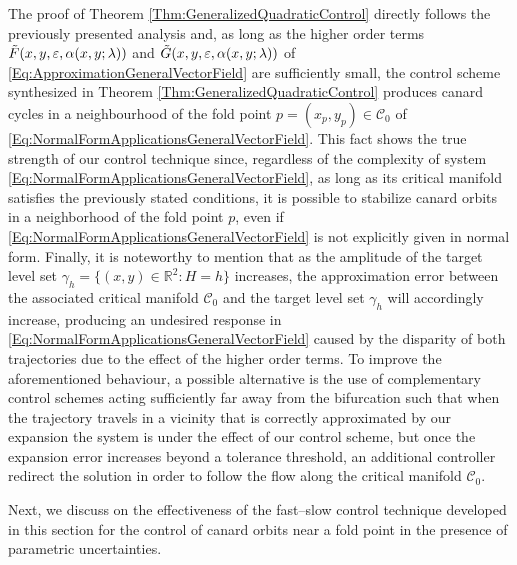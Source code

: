 \documentclass[3p]{elsarticle}
\theoremstyle{plain}
\theoremstyle{remark}
\theoremstyle{definition}
\begin{document}
    The proof of Theorem \ref{Thm:GeneralizedQuadraticControl} directly follows the previously presented analysis and, as long as the higher order terms $\Tilde{F}(x,y,\varepsilon,\alpha(x,y;\lambda))$ and $\Tilde{G}(x,y,\varepsilon,\alpha(x,y;\lambda))$ of \eqref{Eq:ApproximationGeneralVectorField} are sufficiently small, the control scheme synthesized in Theorem \ref{Thm:GeneralizedQuadraticControl} produces canard cycles in a neighbourhood of the fold point $p=(x_{p}, y_{p})\in\mathcal{C}_{0}$ of \eqref{Eq:NormalFormApplicationsGeneralVectorField}. This fact shows the true strength of our control technique since, regardless of the complexity of system \eqref{Eq:NormalFormApplicationsGeneralVectorField}, as long as its critical manifold satisfies the previously stated conditions, it is possible to stabilize canard orbits in a neighborhood of the fold point $p$, even if \eqref{Eq:NormalFormApplicationsGeneralVectorField} is not explicitly given in normal form. Finally, it is noteworthy to mention that as the amplitude of the target level set $\gamma_{h} = \{ (x,y)\in\mathbb{R}^{2}:H=h \}$ increases, the approximation error between the associated critical manifold $\mathcal{C}_{0}$ and the target level set $\gamma_{h}$ will accordingly increase, producing an undesired response in \eqref{Eq:NormalFormApplicationsGeneralVectorField} caused by the disparity of both trajectories due to the effect of the higher order terms. To improve the aforementioned behaviour, a possible alternative is the use of complementary control schemes acting sufficiently far away from the bifurcation such that when the trajectory travels in a vicinity that is correctly approximated by our expansion the system is under the effect of our control scheme, but once the expansion error increases beyond a tolerance threshold, an additional controller redirect the solution in order to follow the flow along the critical manifold $\mathcal{C}_{0}$.

Next, we discuss on the effectiveness of the fast--slow control technique developed in this section for the control of canard orbits near a fold point in the presence of parametric uncertainties. 
\end{document}

